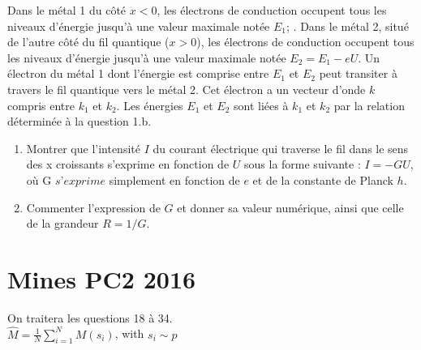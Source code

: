 \documentclass{article}
\begin{document}
\begin{enumerate}
Dans le métal 1 du côté $x < 0$, les électrons de conduction occupent tous les niveaux d’énergie
jusqu'à une valeur maximale notée $E_1$; . Dans le métal 2, situé de l’autre côté du fil quantique
($x>0$), les électrons de conduction occupent tous les niveaux d’énergie jusqu’à une valeur
maximale notée $E_2 = E_1 - eU$. Un électron du métal 1 dont l’énergie est comprise entre $E_1$
et $E_2$ peut transiter à travers le fil quantique vers le métal 2. Cet électron a un vecteur d’onde
$k$ compris entre $k_1$ et $k_2$. Les énergies $E_1$ et $E_2$ sont liées à $k_1$ et $k_2$ par la relation déterminée
à la question 1.b.
\begin{enumerate}
  \item Montrer que l'intensité $I$ du courant électrique qui traverse le fil dans le sens des x croissants
  s’exprime en fonction de $U$ sous la forme suivante : $I=-GU$, où G $s’exprime$ simplement
  en fonction de $e$ et de la constante de Planck $h$.
  \item Commenter l’expression de $G$ et donner sa valeur numérique, ainsi que celle de la grandeur
  $R=1/G$.
\end{enumerate}
\end{enumerate}


\section{Mines PC2 2016 }

On traitera les questions 18 à 34. \\[0.5cm]



$\hat{M} = \frac{1}{N} \sum_{i=1}^{N} M(s_i) $,  with $s_i \sim p$
\end{document}
